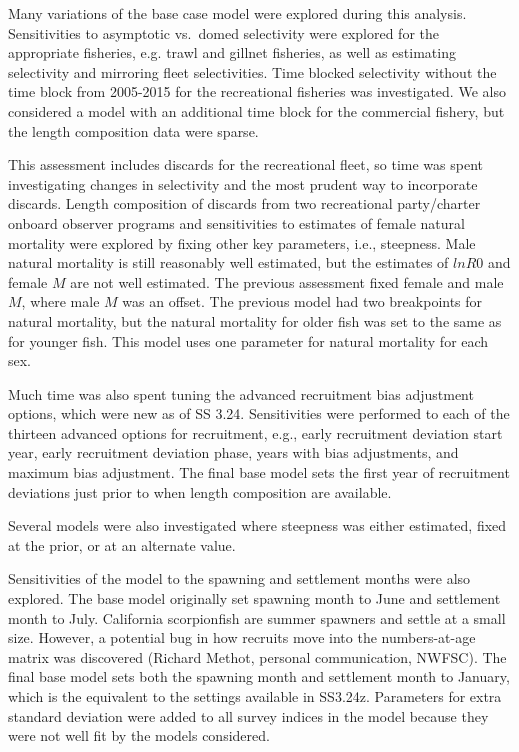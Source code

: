 \documentclass[12pt,]{article}
\begin{document}
Many variations of the base case model were explored during this
analysis. Sensitivities to asymptotic vs.~domed selectivity were
explored for the appropriate fisheries, e.g. trawl and gillnet
fisheries, as well as estimating selectivity and mirroring fleet
selectivities. Time blocked selectivity without the time block from
2005-2015 for the recreational fisheries was investigated. We also
considered a model with an additional time block for the commercial
fishery, but the length composition data were sparse.

This assessment includes discards for the recreational fleet, so time
was spent investigating changes in selectivity and the most prudent way
to incorporate discards. Length composition of discards from two
recreational party/charter onboard observer programs and sensitivities
to estimates of female natural mortality were explored by fixing other
key parameters, i.e., steepness. Male natural mortality is still
reasonably well estimated, but the estimates of \(lnR0\) and female
\(M\) are not well estimated. The previous assessment fixed female and
male \(M\), where male \(M\) was an offset. The previous model had two
breakpoints for natural mortality, but the natural mortality for older
fish was set to the same as for younger fish. This model uses one
parameter for natural mortality for each sex.

Much time was also spent tuning the advanced recruitment bias adjustment
options, which were new as of SS 3.24. Sensitivities were performed to
each of the thirteen advanced options for recruitment, e.g., early
recruitment deviation start year, early recruitment deviation phase,
years with bias adjustments, and maximum bias adjustment. The final base
model sets the first year of recruitment deviations just prior to when
length composition are available.

Several models were also investigated where steepness was either
estimated, fixed at the prior, or at an alternate value.

Sensitivities of the model to the spawning and settlement months were
also explored. The base model originally set spawning month to June and
settlement month to July. California scorpionfish are summer spawners
and settle at a small size. However, a potential bug in how recruits
move into the numbers-at-age matrix was discovered (Richard Methot,
personal communication, NWFSC). The final base model sets both the
spawning month and settlement month to January, which is the equivalent
to the settings available in SS3.24z. Parameters for extra standard
deviation were added to all survey indices in the model because they
were not well fit by the models considered.
\end{document}
